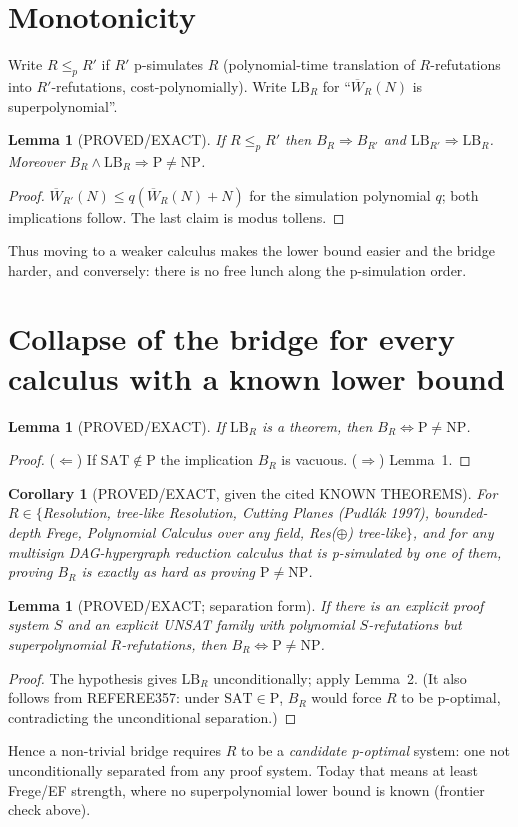 \documentclass[11pt]{article}
\newtheorem{lemma}[theorem]{Lemma}
\newtheorem{corollary}[theorem]{Corollary}
\newcommand{\SAT}{\mathrm{SAT}}
\newcommand{\Wb}{\overline W}
\begin{document}
\section{Monotonicity}
Write $R\le_p R'$ if $R'$ p-simulates $R$ (polynomial-time translation of
$R$-refutations into $R'$-refutations, cost-polynomially). Write
$\mathrm{LB}_R$ for ``$\Wb_R(N)$ is superpolynomial''.
\begin{lemma}[PROVED/EXACT]
If $R\le_p R'$ then $B_R\Rightarrow B_{R'}$ and $\mathrm{LB}_{R'}\Rightarrow
\mathrm{LB}_R$. Moreover $B_R\wedge\mathrm{LB}_R\Rightarrow\mathrm{P}\neq\mathrm{NP}$.
\end{lemma}
\begin{proof}
$\Wb_{R'}(N)\le q(\Wb_R(N)+N)$ for the simulation polynomial $q$; both
implications follow. The last claim is modus tollens.
\end{proof}
Thus moving to a weaker calculus makes the lower bound easier and the bridge
harder, and conversely: there is no free lunch along the p-simulation order.

\section{Collapse of the bridge for every calculus with a known lower bound}
\begin{lemma}[PROVED/EXACT]
If $\mathrm{LB}_R$ is a theorem, then $B_R\iff\mathrm P\neq\mathrm{NP}$.
\end{lemma}
\begin{proof}
($\Leftarrow$) If $\SAT\notin\mathrm P$ the implication $B_R$ is vacuous.
($\Rightarrow$) Lemma~1.
\end{proof}
\begin{corollary}[PROVED/EXACT, given the cited KNOWN THEOREMS]
For $R\in\{$Resolution, tree-like Resolution, Cutting Planes (Pudlák 1997),
bounded-depth Frege, Polynomial Calculus over any field, Res($\oplus$)
tree-like$\}$, and for any multisign DAG-hypergraph reduction calculus that
is p-simulated by one of them, proving $B_R$ is exactly as hard as proving
$\mathrm P\neq\mathrm{NP}$.
\end{corollary}
\begin{lemma}[PROVED/EXACT; separation form]
If there is an explicit proof system $S$ and an explicit UNSAT family with
polynomial $S$-refutations but superpolynomial $R$-refutations, then
$B_R\iff\mathrm P\neq\mathrm{NP}$.
\end{lemma}
\begin{proof}
The hypothesis gives $\mathrm{LB}_R$ unconditionally; apply Lemma~2. (It also
follows from REFEREE357: under $\SAT\in\mathrm P$, $B_R$ would force $R$ to be
p-optimal, contradicting the unconditional separation.)
\end{proof}
Hence a non-trivial bridge requires $R$ to be a \emph{candidate p-optimal}
system: one not unconditionally separated from any proof system. Today that
means at least Frege/EF strength, where no superpolynomial lower bound is
known (frontier check above).
\end{document}
